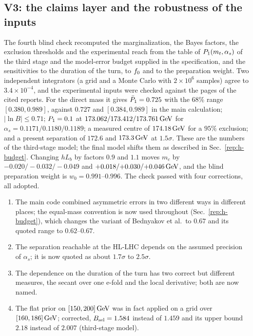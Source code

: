 \subsection{V3: the claims layer and the robustness of the inputs}\label{sec:v19-v3}

The fourth blind check recomputed the marginalization, the Bayes factors, the exclusion thresholds and the experimental reach from the table of $P_1(m_t,\alpha_s)$ of the third stage and the model-error budget supplied in the specification, and the sensitivities to the duration of the turn, to $f_0$ and to the preparation weight.
Two independent integrators (a grid and a Monte Carlo with $2\times10^6$ samples) agree to $3.4\times10^{-4}$, and the experimental inputs were checked against the pages of the cited reports. %
For the direct mass it gives $\bar P_1=0.725$ with the $68\%$ range $[0.380,0.989]$, against $0.727$ and $[0.384,0.989]$ in the main calculation; $|\ln B|\le0.71$; $P_1=0.1$ at $173.062/\allowbreak 173.412/\allowbreak 173.761\,\mathrm{GeV}$ for $\alpha_s=0.1171/\allowbreak 0.1180/\allowbreak 0.1189$; a measured centre of $174.18\,\mathrm{GeV}$ for a $95\%$ exclusion; and a present separation of $172.6$ and $173.3\,\mathrm{GeV}$ at $1.5\sigma$. %
These are the numbers of the third-stage model; the final model shifts them as described in Sec.~\ref{rep:h-budget}.
Changing $hL_b$ by factors $0.9$ and $1.1$ moves $m_c$ by $-0.020/\allowbreak{-}0.032/\allowbreak{-}0.049$ and $+0.018/\allowbreak{+}0.030/\allowbreak{+}0.046\,\mathrm{GeV}$, and the blind preparation weight is $w_0=0.991$--$0.996$. %
The check passed with four corrections, all adopted.
\begin{enumerate}
\item The main code combined asymmetric errors in two different ways in different places; the equal-mass convention is now used throughout (Sec.~\ref{rep:h-budget}), which changes the variant of Bednyakov et al.\ to $0.67$ and its quoted range to $0.62$--$0.67$.
\item The separation reachable at the HL-LHC depends on the assumed precision of $\alpha_s$; it is now quoted as about $1.7\sigma$ to $2.5\sigma$.
\item The dependence on the duration of the turn has two correct but different measures, the secant over one e-fold and the local derivative; both are now named.
\item The flat prior on $[150,200]\,\mathrm{GeV}$ was in fact applied on a grid over $[160,186]\,\mathrm{GeV}$; corrected, $B_{\rm sel}=1.584$ instead of $1.459$ and its upper bound $2.18$ instead of $2.007$ (third-stage model). %
\end{enumerate}

